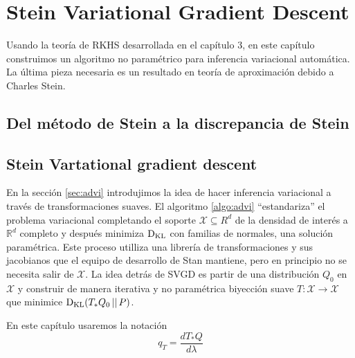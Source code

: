 \documentclass[main.tex]{subfiles}
\begin{document}
\chapter{Stein Variational Gradient Descent}
Usando la teoría de RKHS desarrollada en el capítulo 3, en este capítulo
construimos un algoritmo no paramétrico para inferencia variacional automática.
La última pieza necesaria es un resultado en teoría de aproximación debido a
Charles Stein.
\section{Del método de Stein a la discrepancia de Stein}

\section{Stein Vartational gradient descent}
En la sección \ref{sec:advi} introdujimos la idea de hacer inferencia
variacional a través de transformaciones suaves. El algoritmo \eqref{algo:advi}
\enquote{estandariza} el problema variacional completando el soporte
$\mathcal{X}\subseteq{R}^d$ de la densidad de interés a $\mathbb{R}^d$ completo
y después minimiza $\operatorname*{D_{KL}}$ con familias de normales, una solución paramétrica.
Este proceso utilliza una librería de transformaciones y sus jacobianos que el
equipo de desarrollo de Stan mantiene\cite{advi}, pero en principio no se
necesita salir de $\mathcal{X}$. La idea detrás de SVGD es partir de una
distribución $Q_0$ en $\mathcal{X}$ y construir de manera iterativa y no
paramétrica biyección suave $T: \mathcal{X} \to \mathcal{X}$ que minimice
$\operatorname*{D_{KL}}(T_*Q_0\operatorname*{\mid\mid} P)$. 

En este capítulo usaremos la notación
\begin{equation*}
    q_T = \frac{dT_*Q}{d\lambda}
\end{equation*}
\end{document}
